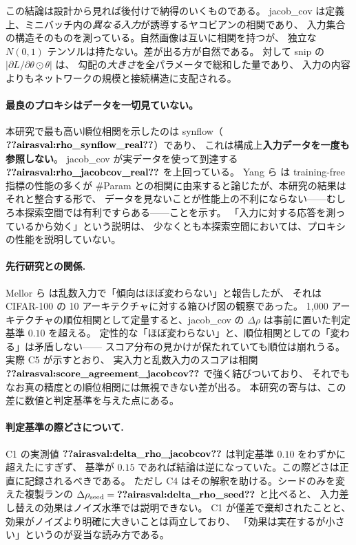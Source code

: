 \documentclass[11pt]{article}
\providecommand{\airasval}[1]{\textbf{??airasval:\detokenize{#1}??}}
\begin{document}
この結論は設計から見れば後付けで納得のいくものである。
jacob\_cov は定義上、ミニバッチ内の\emph{異なる入力}が誘導するヤコビアンの相関であり、
入力集合の構造そのものを測っている。自然画像は互いに相関を持つが、
独立な $N(0,1)$ テンソルは持たない。差が出る方が自然である。
対して snip の $|\partial L/\partial\theta \odot \theta|$ は、
勾配の\emph{大きさ}を全パラメータで総和した量であり、
入力の内容よりもネットワークの規模と接続構造に支配される。

\paragraph{最良のプロキシはデータを一切見ていない。}
本研究で最も高い順位相関を示したのは synflow（$\airasval{rho_synflow_real}$）であり、
これは構成上\textbf{入力データを一度も参照しない}。
jacob\_cov が実データを使って到達する $\airasval{rho_jacobcov_real}$ を上回っている。
Yang ら \cite{yang2023revisiting} は training-free 指標の性能の多くが
\#Param との相関に由来すると論じたが、本研究の結果はそれと整合する形で、
データを見ないことが性能上の不利にならない——むしろ本探索空間では有利ですらある——ことを示す。
「入力に対する応答を測っているから効く」という説明は、
少なくとも本探索空間においては、プロキシの性能を説明していない。

\paragraph{先行研究との関係.}
Mellor ら \cite{mellor2021naswot} は乱数入力で「傾向はほぼ変わらない」と報告したが、
それは CIFAR-100 の 10 アーキテクチャに対する箱ひげ図の観察であった。
1{,}000 アーキテクチャの順位相関として定量すると、jacob\_cov の
$\Delta\rho$ は事前に置いた判定基準 $0.10$ を超える。
定性的な「ほぼ変わらない」と、順位相関としての「変わる」は矛盾しない——
スコア分布の見かけが保たれていても順位は崩れうる。実際 C5 が示すとおり、
実入力と乱数入力のスコアは相関 $\airasval{score_agreement_jacobcov}$ で強く結びついており、
それでもなお真の精度との順位相関には無視できない差が出る。
本研究の寄与は、この差に数値と判定基準を与えた点にある。

\paragraph{判定基準の際どさについて.}
C1 の実測値 $\airasval{delta_rho_jacobcov}$ は判定基準 $0.10$ をわずかに超えたにすぎず、
基準が $0.15$ であれば結論は逆になっていた。この際どさは正直に記録されるべきである。
ただし C4 はその解釈を助ける。シードのみを変えた複製ランの
$\Delta\rho_{\mathrm{seed}} = \airasval{delta_rho_seed}$ と比べると、
入力差し替えの効果はノイズ水準では説明できない。
C1 が僅差で棄却されたことと、効果がノイズより明確に大きいことは両立しており、
「効果は実在するが小さい」というのが妥当な読み方である。
\end{document}
